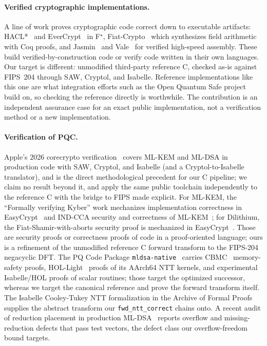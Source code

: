 \documentclass[journal=tches,submission,review]{iacrtrans}
\newcommand{\code}[1]{\texttt{#1}}
\begin{document}
\paragraph{Verified cryptographic implementations.} A line of work proves cryptographic code correct
down to executable artifacts: HACL*~\cite{hacl} and EverCrypt~\cite{evercrypt} in F$^\star$,
Fiat-Crypto~\cite{fiatcrypto} which synthesizes field arithmetic with Coq proofs, and Jasmin~\cite{jasmin}
and Vale~\cite{vale} for verified high-speed assembly. These build verified-by-construction code or
verify code written in their own languages. Our target is different: unmodified third-party reference C,
checked as-is against FIPS~204 through SAW, Cryptol, and Isabelle. Reference implementations like this one
are what integration efforts such as the Open Quantum Safe project~\cite{liboqs} build on, so checking the
reference directly is worthwhile. The contribution is an independent assurance case for an exact public
implementation, not a verification method or a new implementation.

\paragraph{Verification of PQC.} Apple's 2026 corecrypto verification~\cite{corecrypto} covers ML-KEM and
ML-DSA in production code with SAW, Cryptol, and Isabelle (and a Cryptol-to-Isabelle translator), and is
the direct methodological precedent for our C pipeline; we claim no result beyond it, and apply the same
public toolchain independently to the reference C with the bridge to FIPS made explicit. For ML-KEM, the
``Formally verifying Kyber'' work mechanizes implementation correctness in EasyCrypt~\cite{fvkyber4} and
IND-CCA security and correctness of ML-KEM~\cite{fvkyber5}; for Dilithium, the Fiat-Shamir-with-aborts
security proof is mechanized in EasyCrypt~\cite{jazzdilithium}. Those are security proofs or
correctness proofs of code in a proof-oriented language; ours is a refinement of the unmodified reference
C forward transform to the FIPS-204 negacyclic DFT. The PQ Code Package \code{mldsa-native}~\cite{mldsanative}
carries CBMC~\cite{cbmc} memory-safety proofs, HOL-Light~\cite{hollight} proofs of its AArch64 NTT
kernels, and experimental Isabelle/HOL proofs of scalar routines; those target the optimized successor,
whereas we target the canonical reference and prove the forward transform itself. The Isabelle Cooley-Tukey
NTT formalization in the Archive of Formal Proofs~\cite{afpntt} supplies the abstract transform our
\code{fwd\_ntt\_correct} chains onto. A recent audit of reduction placement in production
ML-DSA~\cite{eprint1032} reports overflow and missing-reduction defects that pass test vectors, the defect
class our overflow-freedom bound targets.
\end{document}
